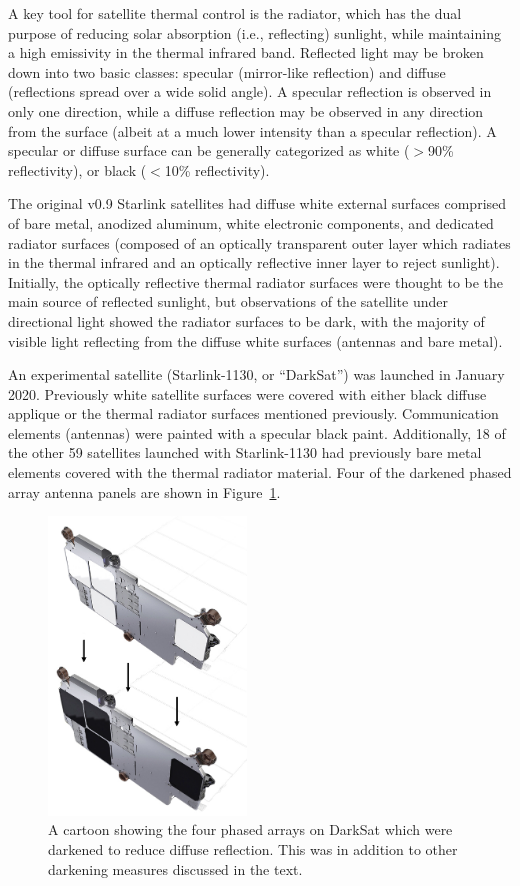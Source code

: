 \documentclass[twocolumn,trackchanges]{aastex63}
\begin{document}
A key tool for satellite thermal control is the radiator, which has the dual purpose of reducing solar absorption (i.e., reflecting) sunlight, while maintaining a high emissivity in the thermal infrared band. Reflected light may be broken down into two basic classes: specular (mirror-like reflection) and diffuse (reflections spread over a wide solid angle). A specular reflection is observed in only one direction, while a diffuse reflection may be observed in any direction from the surface (albeit at a much lower intensity than a specular reflection). A specular or diffuse surface can be generally categorized as white ($>$90\% reflectivity), or black ($<$10\% reflectivity).

The original v0.9 Starlink satellites had diffuse white external surfaces comprised of bare metal, anodized aluminum, white electronic components, and dedicated radiator surfaces (composed of an optically transparent outer layer which radiates in the thermal infrared and an optically reflective inner layer to reject sunlight). Initially, the optically reflective thermal radiator surfaces were thought to be the main source of reflected sunlight, but observations of the satellite under directional light showed the radiator surfaces to be dark, with the majority of visible light reflecting from the diffuse white surfaces (antennas and bare metal).

An experimental satellite (Starlink-1130, or ``DarkSat'') was launched in January 2020. Previously white satellite surfaces were covered with either black diffuse applique or the thermal radiator surfaces mentioned previously. Communication elements (antennas) were painted with a specular black paint. Additionally, 18 of the other 59 satellites launched with Starlink-1130 had previously bare metal elements covered with the thermal radiator material. Four of the darkened phased array antenna panels are shown in Figure~\ref{fig:darksat}.

\begin{figure}[ht]
\includegraphics[trim=+1cm 0 0 0, width=0.47\textwidth]{Darksat.jpg}
\caption{A cartoon showing the four phased arrays on DarkSat which were darkened to reduce diffuse reflection. This was in addition to other darkening measures discussed in the text.\label{fig:darksat}}
\end{figure}
\end{document}
